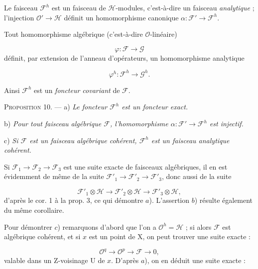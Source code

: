 Le faisceau $\mathcal{F}^h$ est un faisceau de $\mathcal{H}$-modules, c'est-à-dire un faisceau \emph{analytique} ; l'injection $\mathcal{O}' \to \mathcal{H}$ définit un homomorphisme canonique $\alpha : \mathcal{F}' \to \mathcal{F}^h$.

Tout homomorphisme algébrique (c'est-à-dire $\mathcal{O}$-linéaire)

\begin{equation*}
\varphi : \mathcal{F} \to \mathcal{G}
\end{equation*}
définit, par extension de l'anneau d'opérateurs, un homomorphisme analytique

\begin{equation*}
\varphi^h : \mathcal{F}^h \to \mathcal{G}^h.
\end{equation*}


Ainsi $\mathcal{F}^h$ est un \emph{foncteur covariant} de $\mathcal{F}$.

\textsc{Proposition} 10. --- a) \emph{Le foncteur $\mathcal{F}^h$ est un foncteur exact.}

b) \emph{Pour tout faisceau algébrique $\mathcal{F}$, l'homomorphisme $\alpha : \mathcal{F}' \to \mathcal{F}^h$ est injectif.}

c) \emph{Si $\mathcal{F}$ est un faisceau algébrique cohérent, $\mathcal{F}^h$ est un faisceau analytique cohérent.}

Si $\mathcal{F}_1 \to \mathcal{F}_2 \to \mathcal{F}_3$ est une suite exacte de faisceaux algébriques, il en est évidemment de même de la suite $\mathcal{F}'_1 \to \mathcal{F}'_2 \to \mathcal{F}'_3$, donc aussi de la suite

\begin{equation*}
\mathcal{F}'_1 \otimes \mathcal{H} \to \mathcal{F}'_2 \otimes \mathcal{H} \to \mathcal{F}'_3 \otimes \mathcal{H},
\end{equation*}
d'après le cor. 1 à la prop. 3, ce qui démontre $a$). L'assertion $b$) résulte également du même corollaire.

Pour démontrer $c$) remarquons d'abord que l'on a $\mathcal{O}^h = \mathcal{H}$ ; si alors $\mathcal{F}$ est algébrique cohérent, et si $x$ est un point de $\mathrm{X}$, on peut trouver une suite exacte :

\begin{equation*}
\mathcal{O}^q \to \mathcal{O}^p \to \mathcal{F} \to 0,
\end{equation*}
valable dans un Z-voisinage $\mathrm{U}$ de $x$. D'après $a$), on en déduit une suite exacte :

